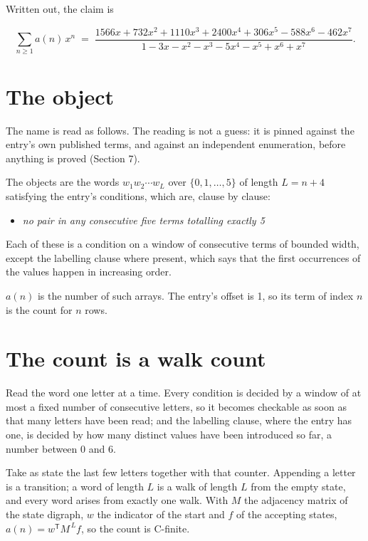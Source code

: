 \documentclass[11pt]{article}
\theoremstyle{definition}
\begin{document}
Written out, the claim is

\[\sum_{n \ge 1} a(n)\,x^n \;=\; \frac{1566x + 732x^{2} + 1110x^{3} + 2400x^{4} + 306x^{5} - 588x^{6} - 462x^{7}}{1 - 3x - x^{2} - x^{3} - 5x^{4} - x^{5} + x^{6} + x^{7}}.\]

\section{The object}

The name is read as follows. The reading is not a guess: it is pinned against the entry's own published terms, and against an independent enumeration, before anything is proved (Section 7).

The objects are the words $w_1 w_2 \cdots w_L$ over $\{0,1,\dots,5\}$ of length $L = n + 4$ satisfying the entry's conditions, which are, clause by clause:

\begin{itemize}

\item {\itshape no pair in any consecutive five terms totalling exactly 5}

\end{itemize}

Each of these is a condition on a window of consecutive terms of bounded width, except the labelling clause where present, which says that the first occurrences of the values happen in increasing order.

$a(n)$ is the number of such arrays. The entry's offset is 1, so its term of index $n$ is the count for $n$ rows.

\section{The count is a walk count}

Read the word one letter at a time. Every condition is decided by a window of at most a fixed number of consecutive letters, so it becomes checkable as soon as that many letters have been read; and the labelling clause, where the entry has one, is decided by how many distinct values have been introduced so far, a number between $0$ and 6.

Take as state the last few letters together with that counter. Appending a letter is a transition; a word of length $L$ is a walk of length $L$ from the empty state, and every word arises from exactly one walk. With $M$ the adjacency matrix of the state digraph, $w$ the indicator of the start and $f$ of the accepting states, $a(n) = w^{\mathsf T}M^{\,L}f$, so the count is C-finite.
\end{document}
